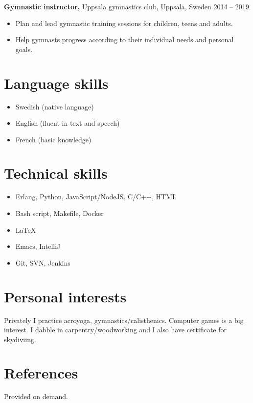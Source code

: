 \documentclass[margin]{res}
\begin{document}
\begin{resume}
{\bf Gymnastic instructor,} Uppsala gymnastics club, Uppsala, Sweden \hfill 2014 -- 2019
\begin{itemize} \itemsep -2pt
\item Plan and lead gymnastic training sessions for children, teens and adults.
\item Help gymnasts progress according to their individual needs and personal goals.
\end{itemize}

\section{Language skills}
\begin{itemize} \itemsep -2pt
\item Swedish (native language)
\item English (fluent in text and speech)
\item French (basic knowledge)
\end{itemize}

\section{Technical skills}
\begin{itemize} \itemsep -2pt
\item Erlang, Python, JavaScript/NodeJS, C/C++, HTML
\item Bash script, Makefile, Docker
\item LaTeX
\item Emacs, IntelliJ
\item Git, SVN, Jenkins
\end{itemize}

\section{Personal interests}
Privately I practice acroyoga, gymnastics/calisthenics. Computer games is a big interest. I dabble
in carpentry/woodworking and I also have certificate for skydiviing.

\section{References}
Provided on demand.

\end{resume}
\end{document}
